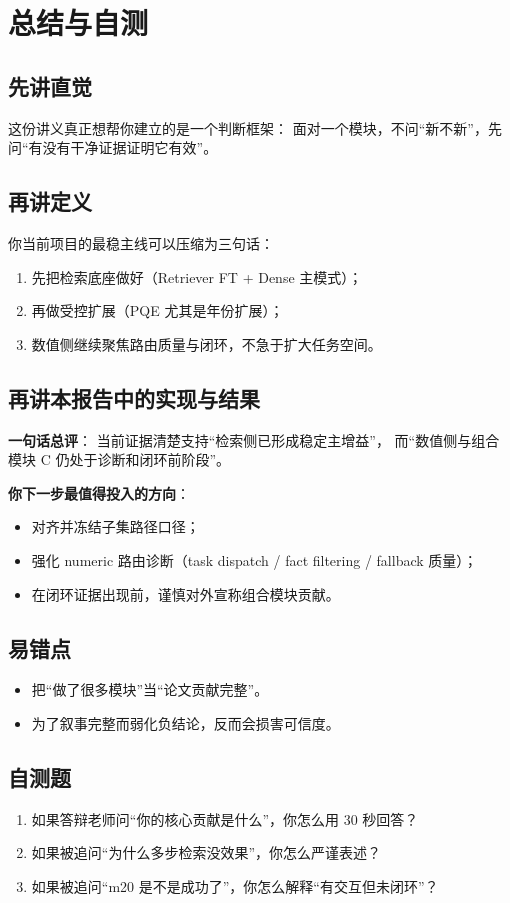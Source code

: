 \documentclass[UTF8,a4paper,12pt]{ctexart}
\begin{document}
\section{总结与自测}
\subsection{先讲直觉}
这份讲义真正想帮你建立的是一个判断框架：
面对一个模块，不问“新不新”，先问“有没有干净证据证明它有效”。

\subsection{再讲定义}
你当前项目的最稳主线可以压缩为三句话：
\begin{enumerate}
  \item 先把检索底座做好（Retriever FT + Dense 主模式）；
  \item 再做受控扩展（PQE 尤其是年份扩展）；
  \item 数值侧继续聚焦路由质量与闭环，不急于扩大任务空间。
\end{enumerate}

\subsection{再讲本报告中的实现与结果}
\textbf{一句话总评}：  
当前证据清楚支持“检索侧已形成稳定主增益”，
而“数值侧与组合模块 C 仍处于诊断和闭环前阶段”。

\textbf{你下一步最值得投入的方向}：
\begin{itemize}
  \item 对齐并冻结子集路径口径；
  \item 强化 numeric 路由诊断（task dispatch / fact filtering / fallback 质量）；
  \item 在闭环证据出现前，谨慎对外宣称组合模块贡献。
\end{itemize}

\subsection{易错点}
\begin{itemize}
  \item 把“做了很多模块”当“论文贡献完整”。
  \item 为了叙事完整而弱化负结论，反而会损害可信度。
\end{itemize}

\subsection{自测题}
\begin{enumerate}
  \item 如果答辩老师问“你的核心贡献是什么”，你怎么用 30 秒回答？
  \item 如果被追问“为什么多步检索没效果”，你怎么严谨表述？
  \item 如果被追问“m20 是不是成功了”，你怎么解释“有交互但未闭环”？
\end{enumerate}
\end{document}
